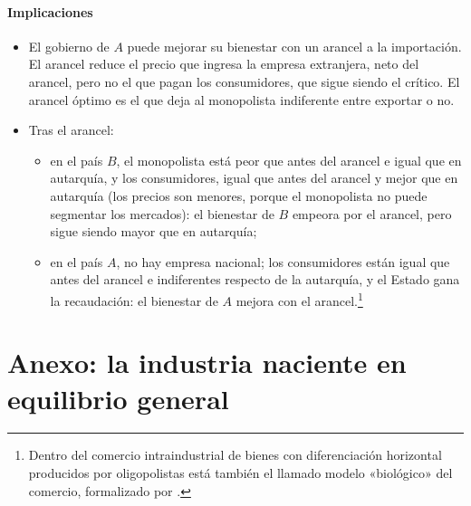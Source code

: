 \documentclass[11pt]{article}
\begin{document}
\paragraph{Implicaciones}

\begin{itemize}
\item El gobierno de $A$ puede mejorar su bienestar con un arancel a la importación. El arancel reduce el precio que ingresa la empresa extranjera, neto del arancel, pero no el que pagan los consumidores, que sigue siendo el crítico. El arancel óptimo es el que deja al monopolista indiferente entre exportar o no.
\item Tras el arancel:
  \begin{itemize}
  \item en el país $B$, el monopolista está peor que antes del arancel e igual que en autarquía, y los consumidores, igual que antes del arancel y mejor que en autarquía (los precios son menores, porque el monopolista no puede segmentar los mercados): el bienestar de $B$ empeora por el arancel, pero sigue siendo mayor que en autarquía;
  \item en el país $A$, no hay empresa nacional; los consumidores están igual que antes del arancel e indiferentes respecto de la autarquía, y el Estado gana la recaudación: el bienestar de $A$ mejora con el arancel.\footnote{Dentro del comercio intraindustrial de bienes con diferenciación horizontal producidos por oligopolistas está también el llamado modelo «biológico» del comercio\nocite{Bhagwati1982Shifting}, formalizado por \textcite{Dinopoulos1988Formalization} .}
  \end{itemize}
\end{itemize}

\section{Anexo: la industria naciente en equilibrio general}\label{anexo:industria-naciente-ge}
\end{document}
